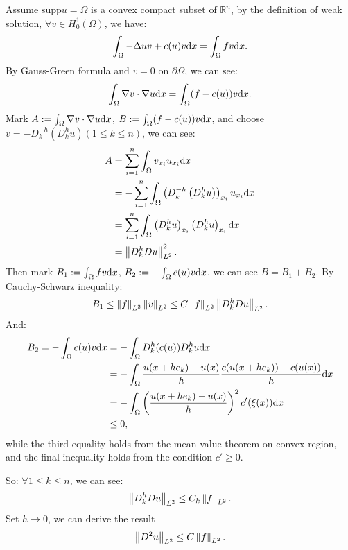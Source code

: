 \begin{solution}
    Assume $\text{supp}u=\Omega$ is a convex compact subset of $\mathbb{R}^{n}$, by the definition of weak solution, $\forall v\in H_{0}^{1}(\Omega)$, we have:
    \begin{equation}
        \label{eq:weak_form}
        \int_{\Omega}-\Delta uv+c(u)v\mathrm{d} x=\int_{\Omega}fv\mathrm{d} x.
    \end{equation}
    By Gauss-Green formula and $v=0$ on $\partial\Omega$, we can see:
    \begin{equation}
        \label{eq:modified_form}
        \int_{\Omega}\nabla v\cdot\nabla u\mathrm{d} x=\int_{\Omega}(f-c(u))v\mathrm{d} x.
    \end{equation}
    Mark $A:=\int_{\Omega}\nabla v\cdot\nabla u\mathrm{d} x$, $B:=\int_{\Omega}(f-c(u))v\mathrm{d} x$, and choose $v=-D_{k}^{-h}\left(D_{k}^{h}u\right)(1\le k\le n)$, we can see:
    \begin{equation}
        \label{eq:approx_A}
        \begin{aligned}
            A&=\sum_{i=1}^{n}\int_{\Omega}v_{x_{i}}u_{x_{i}}\mathrm{d} x\\
            &=-\sum_{i=1}^{n}\int_{\Omega}\left(D_{k}^{-h}\left(D_{k}^{h}u\right)\right)_{x_{i}}u_{x_{i}}\mathrm{d} x\\
            &=\sum_{i=1}^{n}\int_{\Omega}\left(D_{k}^{h}u\right)_{x_{i}}\left(D_{k}^{h}u\right)_{x_{i}}\mathrm{d} x\\
            &=\left\|D_{k}^{h}Du\right\|_{L^2}^2.
        \end{aligned}
    \end{equation} 
    Then mark $B_{1}:=\int_{\Omega}fv\mathrm{d} x$, $B_{2}:=-\int_{\Omega}c(u)v\mathrm{d} x$, we can see $B=B_{1}+B_{2}$. By Cauchy-Schwarz inequality:
    \begin{equation}
        \label{eq:approx_B1}
        B_{1}\le \left\|f\right\|_{L^2}\left\|v\right\|_{L^2}\le C\left\|f\right\|_{L^2}\left\|D_{k}^{h}Du\right\|_{L^2}.
    \end{equation}
    And:
    \begin{equation}
        \label{eq:approx_B2}
        \begin{aligned}
            B_{2}=-\int_{\Omega}c(u)v\mathrm{d} x&=-\int_{\Omega}D_{k}^{h}(c(u))D_{k}^{h}u\mathrm{d} x\\
            &=-\int_{\Omega}\frac{u(x+he_{k})-u(x)}{h}\frac{c(u(x+he_{k}))-c(u(x))}{h}\mathrm{d} x\\
            &=-\int_{\Omega}\left(\frac{u(x+he_{k})-u(x)}{h}\right)^2c'(\xi(x))\mathrm{d} x\\
            &\le 0,
        \end{aligned}
    \end{equation}
    while the third equality holds from the mean value theorem on convex region, and the final inequality holds from the condition $c'\ge 0$.

    So: $\forall 1\le k\le n$, we can see:
    \begin{equation}
        \left\|D_{k}^{h}Du\right\|_{L^2}\le C_{k}\left\|f\right\|_{L^{2}}.
    \end{equation}
    Set $h\rightarrow 0$, we can derive the result 
    \begin{equation}
        \left\|D^{2}u\right\|_{L^2}\le C\left\|f\right\|_{L^2}.
    \end{equation}
\end{solution}
